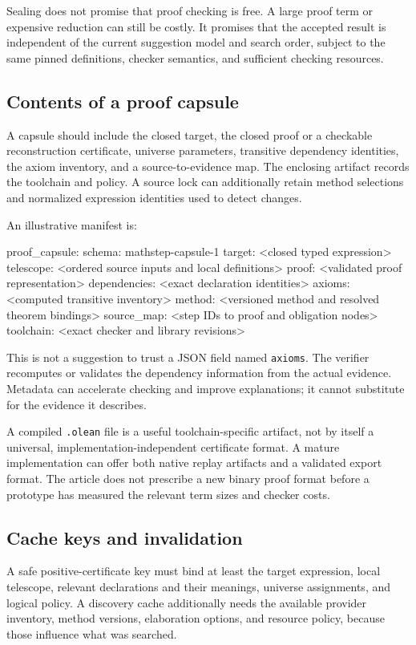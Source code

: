 \documentclass[11pt,a4paper]{article}
\theoremstyle{remark}
\newcommand{\ty}[1]{\texttt{#1}}
\begin{document}
Sealing does not promise that proof checking is free. A large proof term or expensive reduction can still be costly. It promises that the accepted result is independent of the current suggestion model and search order, subject to the same pinned definitions, checker semantics, and sufficient checking resources.

\subsection{Contents of a proof capsule}
A capsule should include the closed target, the closed proof or a checkable reconstruction certificate, universe parameters, transitive dependency identities, the axiom inventory, and a source-to-evidence map. The enclosing artifact records the toolchain and policy. A source lock can additionally retain method selections and normalized expression identities used to detect changes.

An illustrative manifest is:
\Needspace{142pt}
\begin{code}
proof_capsule:
  schema: mathstep-capsule-1
  target: <closed typed expression>
  telescope: <ordered source inputs and local definitions>
  proof: <validated proof representation>
  dependencies: <exact declaration identities>
  axioms: <computed transitive inventory>
  method: <versioned method and resolved theorem bindings>
  source_map: <step IDs to proof and obligation nodes>
  toolchain: <exact checker and library revisions>
\end{code}
This is not a suggestion to trust a JSON field named \ty{axioms}. The verifier recomputes or validates the dependency information from the actual evidence. Metadata can accelerate checking and improve explanations; it cannot substitute for the evidence it describes.

A compiled \ty{.olean} file is a useful toolchain-specific artifact, not by itself a universal, implementation-independent certificate format. A mature implementation can offer both native replay artifacts and a validated export format. The article does not prescribe a new binary proof format before a prototype has measured the relevant term sizes and checker costs.

\subsection{Cache keys and invalidation}
A safe positive-certificate key must bind at least the target expression, local telescope, relevant declarations and their meanings, universe assignments, and logical policy. A discovery cache additionally needs the available provider inventory, method versions, elaboration options, and resource policy, because those influence what was searched.
\end{document}
